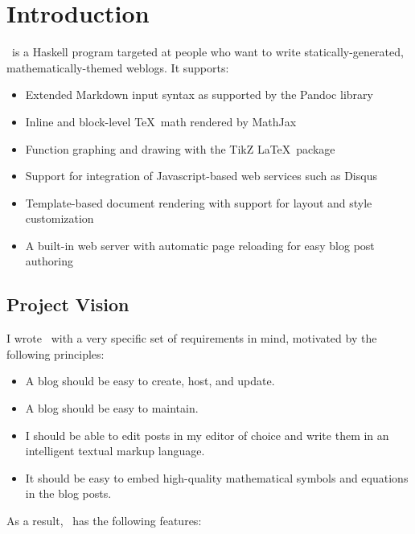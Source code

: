 \documentclass[11pt, letterpaper, oneside, titlepage]{book}
\begin{document}




\chapter{Introduction}

\mathblog\ is a Haskell program targeted at people who want to write
statically-generated, mathematically-themed weblogs.  It supports:

\begin{itemize}
\item{Extended Markdown input syntax as supported by the Pandoc
  library}
\item{Inline and block-level \TeX\ math rendered by MathJax}
\item{Function graphing and drawing with the TikZ \LaTeX\ package}
\item{Support for integration of Javascript-based web services such as
  Disqus}
\item{Template-based document rendering with support for layout and
  style customization}
\item{A built-in web server with automatic page reloading for easy
  blog post authoring}
\end{itemize}

\section{Project Vision}

I wrote \mathblog\ with a very specific set of requirements in mind,
motivated by the following principles:

\begin{itemize}
\item{A blog should be easy to create, host, and update.}
\item{A blog should be easy to maintain.}
\item{I should be able to edit posts in my editor of choice and write
  them in an intelligent textual markup language.}
\item{It should be easy to embed high-quality mathematical symbols and
  equations in the blog posts.}
\end{itemize}

As a result, \mathblog\ has the following features:
\end{document}

